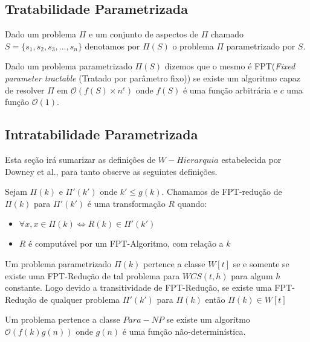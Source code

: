 \subsection{Tratabilidade Parametrizada}
\begin{definition}
Dado um problema $\Pi$ e um conjunto de aspectos de $\Pi$ chamado $S = \{s_1,s_2,s_3,...,s_n\}$ denotamos por $\Pi(S)$ o problema $\Pi$ parametrizado por $S$.
\end{definition}
\begin{definition}
Dado um problema parametrizado $\Pi(S)$ dizemos que o mesmo é FPT(\emph{Fixed parameter tractable} (Tratado por parâmetro fixo)) se existe um algoritmo capaz de resolver $\Pi$ em $\mathcal{O}(f(S)\times n^c)$ onde $f(S)$ é uma função arbitrária e $c$ uma função $\mathcal{O}(1)$.
\end{definition}

\subsection{Intratabilidade Parametrizada}
Esta seção irá sumarizar as definições de $W-Hierarquia$ estabelecida por Downey et al.\cite{downey98}, para tanto observe as seguintes definições.
\begin{definition}
 Sejam $\Pi(k)$ e $\Pi'(k')$ onde $k' \leq g(k)$. Chamamos de FPT-redução de $\Pi(k)$ para $\Pi'(k')$ é uma transformação $R$ quando:
 \begin{itemize}
   \item $\forall x, x \in \Pi(k) \iff R(k) \in \Pi'(k')$
   \item $R$ é computável por um FPT-Algoritmo, com relação a $k$
 \end{itemize}
\end{definition}

\begin{definition}
 Um problema parametrizado $\Pi(k)$ pertence a classe $W[t]$ se e somente se existe uma FPT-Redução de tal problema para $WCS(t,h)$ para algum $h$ constante. Logo devido a transitividade de FPT-Redução, se existe uma FPT-Redução de qualquer problema $\Pi'(k')$ para $\Pi(k)$ então $\Pi(k) \in W[t]$
\end{definition}

\begin{definition}
 Um problema pertence a classe $Para-NP$ se existe um algoritmo $\mathcal{O}(f(k)g(n))$ onde $g(n)$ é uma função não-determinística.
\end{definition}

\begin{corolario}

\end{corolario}

